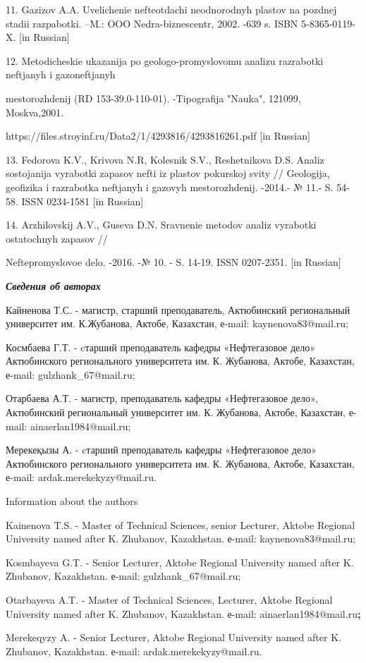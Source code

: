 \begin{noparindent}
11. Gazizov A.A. Uvelichenie nefteotdachi neodnorodnyh plastov na
pozdnej stadii razpabotki. --M.: OOO Nedra-biznescentr, 2002. -639 s.
ISBN 5-8365-0119-X. {[}in Russian{]}

12. Metodicheskie ukazanija po geologo-promyslovomu analizu razrabotki
neftjanyh i gazoneftjanyh

mestorozhdenij (RD 153-39.0-110-01).
-Tipografija "Nauka", 121099, Moskva,2001.

https://files.stroyinf.ru/Data2/1/4293816/4293816261.pdf {[}in
Russian{]}

13. Fedorova K.V., Krivova N.R, Kolesnik S.V., Reshetnikova D.S. Analiz
sostojanija vyrabotki zapasov nefti iz plastov pokurskoj svity //
Geologija, geofizika i razrabotka neftjanyh i gazovyh mestorozhdenij.
-2014.- № 11.- S. 54-58. ISSN 0234-1581 {[}in Russian{]}

14. Arzhilovskij A.V., Guseva D.N. Sravnenie metodov analiz vyrabotki
ostatochnyh zapasov //

Neftepromyslovoe delo. -2016. -№ 10. - S. 14-19.
ISSN 0207-2351. {[}in Russian{]}
\end{noparindent}

{\bfseries \emph{Сведения об авторах}}

\begin{noparindent}
Кайненова Т.С. - магистр, старший преподаватель, Актюбинский
региональный университет им. К.Жубанова, Актобе, Казахстан, е-mail:
kaynenova83@mail.ru;

Космбаева Г.Т. - cтарший преподаватель кафедры «Нефтегазовое дело»
Актюбинского регионального университета им. К. Жубанова, Актобе,
Казахстан, е-mail: gulzhank\_67@mail.ru;

Отарбаева А.Т. - магистр, преподаватель кафедры «Нефтегазовое дело»,
Актюбинский региональный университет им. К. Жубанова, Актобе, Казахстан,
е-mail: ainaerlan1984@mail.ru;

Мерекеқызы А. - cтарший преподаватель кафедры «Нефтегазовое дело»
Актюбинского регионального университета им. К. Жубанова, Актобе,
Казахстан, е-mail: ardak.merekekyzy@mail.ru.

Information about the authors

Kainenova T.S. - Master of Technical Sciences, senior Lecturer, Aktobe
Regional University named after K. Zhubanov, Kazakhstan. е-mail:
kaynenova83@mail.ru;

Kosmbayeva G.T. - Senior Lecturer, Aktobe Regional University named
after K. Zhubanov, Kazakhstan. е-mail: gulzhank\_67@mail.ru;

Otarbayeva A.T. - Master of Technical Sciences, Lecturer, Aktobe
Regional University named after K. Zhubanov, Kazakhstan. е-mail:
ainaerlan1984@mail.ru{\bfseries ;}

Merekeqyzy A. - Senior Lecturer, Aktobe Regional University named after
K. Zhubanov, Kazakhstan. е-mail: ardak.merekekyzy@mail.ru.
\end{noparindent}











